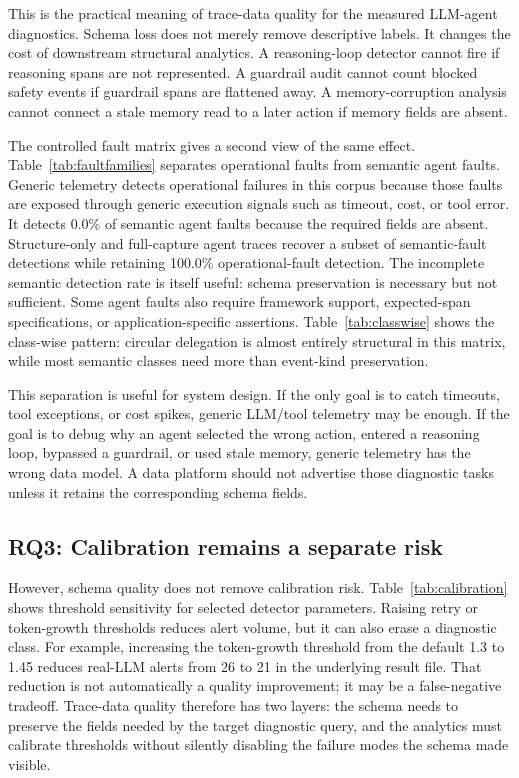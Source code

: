 \documentclass[conference]{IEEEtran}
\begin{document}
This is the practical meaning of trace-data quality for the measured
LLM-agent diagnostics. Schema loss does not merely remove descriptive
labels. It changes the cost of downstream structural analytics. A
reasoning-loop detector cannot fire if reasoning spans are not
represented. A guardrail audit cannot count blocked safety events if
guardrail spans are flattened away. A memory-corruption analysis cannot
connect a stale memory read to a later action if memory fields are
absent.

The controlled fault matrix gives a second view of the same effect.
Table~\ref{tab:faultfamilies} separates operational faults from semantic
agent faults. Generic telemetry detects operational failures in this
corpus because those faults are exposed through generic execution
signals such as timeout, cost, or tool error. It detects 0.0\% of
semantic agent faults because the required fields are absent.
Structure-only and full-capture agent traces recover a subset of
semantic-fault detections while retaining 100.0\% operational-fault
detection. The incomplete semantic detection rate is itself useful:
schema preservation is necessary but not sufficient. Some agent faults
also require framework support, expected-span specifications, or
application-specific assertions. Table~\ref{tab:classwise} shows the
class-wise pattern: circular delegation is almost entirely structural in
this matrix, while most semantic classes need more than event-kind
preservation.

This separation is useful for system design. If the only goal is to
catch timeouts, tool exceptions, or cost spikes, generic LLM/tool
telemetry may be enough. If the goal is to debug why an agent selected
the wrong action, entered a reasoning loop, bypassed a guardrail, or
used stale memory, generic telemetry has the wrong data model. A data
platform should not advertise those diagnostic tasks unless it retains
the corresponding schema fields.

\subsection{\textbf{RQ3}: Calibration remains a separate risk}

However, schema quality does not remove calibration risk.
Table~\ref{tab:calibration} shows threshold sensitivity for selected
detector parameters. Raising retry or token-growth thresholds reduces
alert volume, but it can also erase a diagnostic class. For example,
increasing the token-growth threshold from the default 1.3 to 1.45
reduces real-LLM alerts from 26 to 21 in the underlying result file.
That reduction is not automatically a quality improvement; it may be a
false-negative tradeoff. Trace-data quality therefore has two layers:
the schema needs to preserve the fields needed by the target diagnostic
query, and the analytics must calibrate thresholds without silently
disabling the failure modes the schema made visible.
\end{document}
